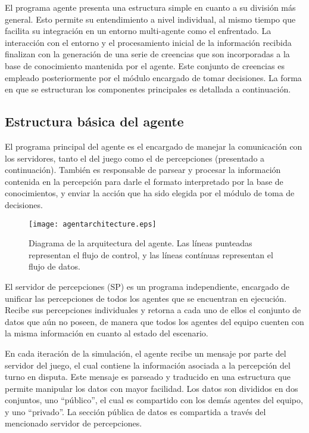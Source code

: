 \documentclass[oneside]{book}
\begin{document}

El programa agente presenta una estructura simple en cuanto a su división más general. 
Esto permite su entendimiento a nivel individual, al mismo tiempo que facilita su 
integración en un entorno multi-agente como el enfrentado. La interacción con el entorno 
y el procesamiento inicial de la información recibida finalizan con la generación de una 
serie de creencias que son incorporadas a la base de conocimiento mantenida por el agente. 
Este conjunto de creencias es empleado posteriormente por el módulo encargado de tomar 
decisiones. La forma en que se estructuran los componentes principales es detallada a 
continuación.

\subsection{Estructura básica del agente}


El programa principal del agente es el encargado de manejar la comunicación con los 
servidores, tanto el del juego como el de percepciones (presentado 
a continuación). También es responsable de parsear y procesar la información contenida 
en la percepción para darle el formato interpretado por la base de conocimientos, y 
enviar la acción que ha sido elegida por el módulo de toma de decisiones.

\begin{figure}
 \centering
 \texttt{[image: agentarchitecture.eps]}
 \caption{Diagrama de la arquitectura del agente. Las líneas punteadas representan el 
 flujo de control, y las líneas contínuas representan el flujo de datos.}
 \label{fig:architecture}
\end{figure}

El servidor de percepciones (SP) es un programa independiente, encargado de unificar las 
percepciones de todos los agentes que se encuentran en ejecución. Recibe sus percepciones 
individuales y retorna a cada uno de ellos el conjunto de datos que aún no poseen, de 
manera que todos los agentes del equipo cuenten con la misma información en cuanto al estado 
del escenario.

En cada iteración de la simulación, el agente recibe un mensaje por parte del servidor 
del juego, el cual contiene la información asociada a la percepción del turno en disputa. 
Este mensaje es parseado y traducido en una estructura que permite manipular los datos 
con mayor facilidad. Los datos son divididos en dos conjuntos, uno ``público'', el cual 
es compartido con los demás agentes del equipo, y uno ``privado''. La sección pública de 
datos es compartida a través del mencionado servidor de percepciones.
\end{document}
